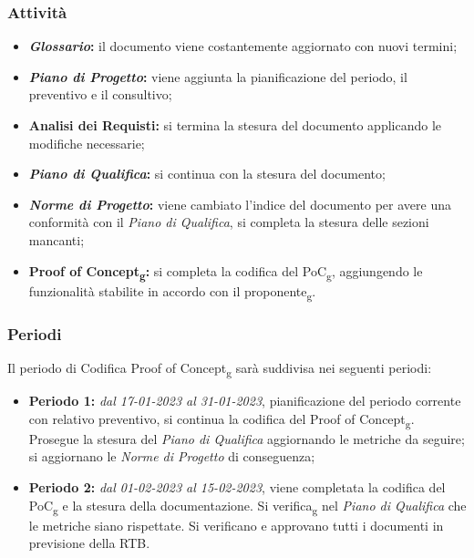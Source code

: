\subsubsection{Attività}
\begin{itemize}
\item \textbf{\textit{Glossario}:} il documento viene costantemente aggiornato con nuovi termini;
\item \textbf{\textit{Piano di Progetto}:} viene aggiunta la pianificazione del periodo, il preventivo e il consultivo;  
\item \textbf{Analisi dei Requisti:} si termina la stesura del documento applicando le modifiche necessarie;
\item \textbf{\textit{Piano di Qualifica}:} si continua con la stesura del documento;
\item \textbf{\textit{Norme di Progetto}:} viene cambiato l'indice del documento per avere una conformità con il \textit{Piano di Qualifica}, 
si completa la stesura delle sezioni mancanti;
\item \textbf{Proof of Concept\textsubscript{g}:} si completa la codifica del PoC\textsubscript{g}, aggiungendo le funzionalità stabilite in accordo con il proponente\textsubscript{g}.
\end{itemize}

\subsubsection{Periodi}
Il periodo di Codifica Proof of Concept\textsubscript{g} sarà suddivisa nei seguenti periodi:
\begin{itemize}
\item \textbf{Periodo 1:} \textit{dal 17-01-2023 al 31-01-2023}, pianificazione del periodo corrente con relativo preventivo, si continua la codifica 
del Proof of Concept\textsubscript{g}. Prosegue la stesura del \textit{Piano di Qualifica} aggiornando le metriche da seguire; si aggiornano le \textit{Norme di Progetto} di conseguenza;
\item \textbf{Periodo 2:} \textit{dal 01-02-2023 al 15-02-2023},  viene completata la codifica del PoC\textsubscript{g} e la stesura della documentazione. 
Si verifica\textsubscript{g} nel \textit{Piano di Qualifica} che le metriche siano rispettate. Si verificano e approvano tutti i documenti in previsione della RTB.
\end{itemize}

